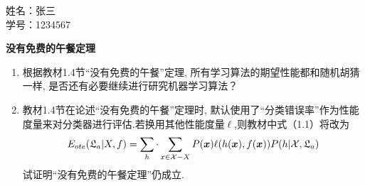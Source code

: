 \documentclass[answers]{exam}  %
\begin{document}
\Large
\noindent
姓名：张三 \\
学号：1234567 \\
\begin{questions}
  \question [20] \textbf{没有免费的午餐定理}

  \begin{enumerate}
    \item 根据教材1.4节“没有免费的午餐”定理, 所有学习算法的期望性能都和随机胡猜一样, 是否还有必要继续进行研究机器学习算法？
    \item 教材1.4节在论述“没有免费的午餐”定理时, 默认使用了“分类错误率”作为性能度量来对分类器进行评估.若换用其他性能度量$\ell$,则教材中式（1.1）将改为
          \begin{equation}
            E_{ote}(\mathfrak{L}_a|X,f)=\sum_h \cdot\sum_{x\in\mathcal{X}-X}P({\boldsymbol{x}})\ell(h({\boldsymbol{x}}),f({\boldsymbol{x}}))P(h|\mathcal{X},\mathfrak{L}_a)
          \end{equation}
          试证明“没有免费的午餐定理”仍成立.
  \end{enumerate}
  \begin{solution}







\end{solution}
\end{questions}
\end{document}
